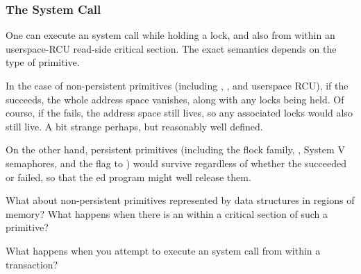 \subsubsection{The  System Call}
\label{sec:future:The exec System Call}

One can execute an  system call while holding a lock, and
also from within an userspace-RCU read-side critical section.
The exact semantics depends on the type of primitive.

In the case of non-persistent primitives (including
, , and userspace RCU),
if the  succeeds, the whole address space vanishes, along
with any locks being held.
Of course, if the  fails, the address space still lives,
so any associated locks would also still live.
A bit strange perhaps, but reasonably well defined.

On the other hand, persistent primitives (including the flock family,
, System V semaphores, and the  flag to
) would survive regardless of whether the 
succeeded or failed, so that the ed program might well
release them.

\QuickQuiz{}
	What about non-persistent primitives represented by data
	structures in  regions of memory?
	What happens when there is an  within a critical
	section of such a primitive?
 \QuickQuizEnd

What happens when you attempt to execute an  system call
from within a transaction?

